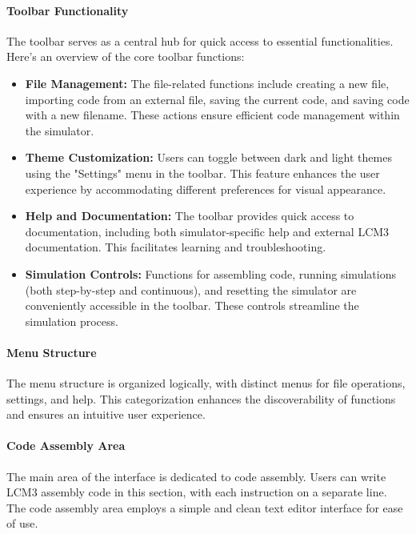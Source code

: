 \documentclass{article}
\begin{document}
\paragraph{Toolbar Functionality}
The toolbar serves as a central hub for quick access to essential functionalities. Here's an overview of the core toolbar functions:
\begin{itemize}
  \item \textbf{File Management:} The file-related functions include creating a new file, importing code from an external file, saving the current code, and saving code with a new filename. These actions ensure efficient code management within the simulator.

  \item \textbf{Theme Customization:} Users can toggle between dark and light themes using the "Settings" menu in the toolbar. This feature enhances the user experience by accommodating different preferences for visual appearance.

  \item \textbf{Help and Documentation:} The toolbar provides quick access to documentation, including both simulator-specific help and external LCM3 documentation. This facilitates learning and troubleshooting.

  \item \textbf{Simulation Controls:} Functions for assembling code, running simulations (both step-by-step and continuous), and resetting the simulator are conveniently accessible in the toolbar. These controls streamline the simulation process.
\end{itemize}

\paragraph{Menu Structure}
The menu structure is organized logically, with distinct menus for file operations, settings, and help. This categorization enhances the discoverability of functions and ensures an intuitive user experience.

\paragraph{Code Assembly Area}
The main area of the interface is dedicated to code assembly. Users can write LCM3 assembly code in this section, with each instruction on a separate line. The code assembly area employs a simple and clean text editor interface for ease of use.
\end{document}
